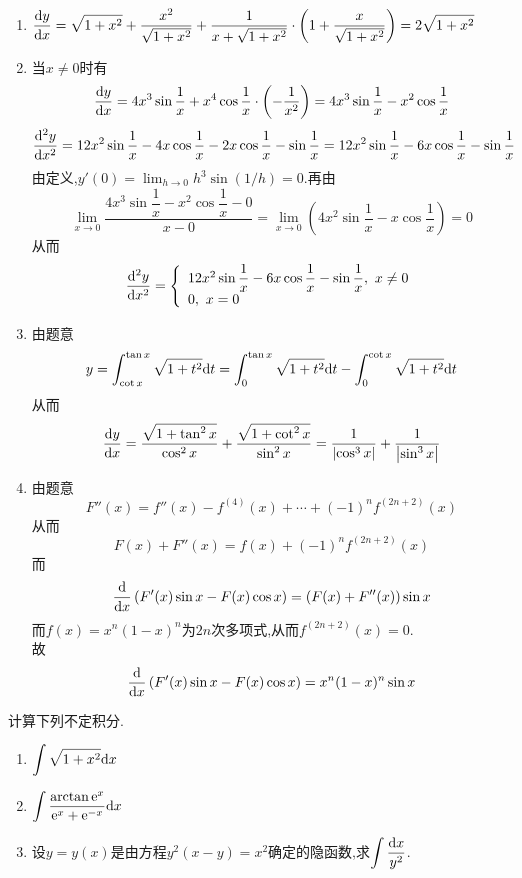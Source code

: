 \documentclass{ctexart}
\begin{document}
\begin{solution}
    \begin{enumerate}[leftmargin=*,label=\textbf{(\arabic*)}]
        \item $\displaystyle\dfrac{\mathrm{d} y}{\mathrm{d} x}
            =\sqrt{1+x^2}+\dfrac{x^2}{\sqrt{1+x^2}}+\dfrac{1}{x+\sqrt{1+x^2}}\cdot\left(1+\dfrac{x}{\sqrt{1+x^2}}\right)
            =2\sqrt{1+x^2}$
        \item 当$x\neq0$时有
            $$\dfrac{\mathrm{d} y}{\mathrm{d} x}=4x^3\sin{\dfrac{1}{x}}+x^4\cos\dfrac{1}{x}\cdot\left(-\dfrac{1}{x^2}\right)=4x^3\sin{\dfrac{1}{x}}-x^2\cos{\dfrac{1}{x}}$$
            $$\dfrac{\mathrm{d}^2y}{\mathrm{d} x^2}=12x^2\sin\dfrac{1}{x}-4x\cos\dfrac{1}{x}-2x\cos\dfrac{1}{x}-\sin\dfrac{1}{x}=12x^2\sin\dfrac{1}{x}-6x\cos\dfrac{1}{x}-\sin\dfrac{1}{x}$$
            由定义,$y'(0)=\displaystyle\lim_{h\to0}h^3\sin(1/h)=0$.再由
            $$\lim_{x\to 0}{\dfrac{4x^3\sin{\dfrac{1}{x}}-x^2\cos{\dfrac{1}{x}}-0}{x-0}}=\lim_{x\to0}\left(4x^2\sin{\dfrac{1}{x}}-x\cos\dfrac{1}{x}\right)=0$$
            从而
            $$\dfrac{\di^2 y}{\dx^2}=\left\{
            \begin{array}{l}
                12x^2\sin\dfrac{1}{x}-6x\cos\dfrac{1}{x}-\sin\dfrac{1}{x},\ x\neq 0 \\
                0,\ x=0
            \end{array}
            \right.$$
        \item 由题意$$y=\int_{\cot x}^{\tan x}\sqrt{1+t^2}\mathrm{d} t=\int_{0}^{\tan x}\sqrt{1+t^2}\mathrm{d} t-\int_{0}^{\cot x}\sqrt{1+t^2}\mathrm{d} t$$
            从而$$\dfrac{\mathrm{d} y}{\mathrm{d} x}=\dfrac{\sqrt{1+\tan^2x}}{\cos^2x}+\dfrac{\sqrt{1+\cot^2x}}{\sin^2x}=\dfrac{1}{\left|\cos^3x\right|}+\dfrac{1}{\left|\sin^3x\right|}$$
        \item 由题意$$F''(x)=f''(x)-f^{(4)}(x)+\cdots+(-1)^nf^{(2n+2)}(x)$$
            从而$$F(x)+F''(x)=f(x)+(-1)^nf^{(2n+2)}(x)$$
            而$$\dfrac{\mathrm{d}}{\mathrm{d} x}\left(F'(x)\sin x-F(x)\cos x\right)=(F(x)+F''(x))\sin x$$
            而$f(x)=x^n(1-x)^n$为$2n$次多项式,从而$f^{(2n+2)}(x)=0$.\\
            故$$\dfrac{\mathrm{d}}{\mathrm{d} x}\left(F'(x)\sin x-F(x)\cos x\right)=x^n(1-x)^n\sin x$$
    \end{enumerate}
\end{solution}
\begin{problem}[3.(15\songti{分})]
    计算下列不定积分.
        \begin{enumerate}[label=\textbf{(\arabic*)}]
            \item $\displaystyle\int\sqrt{1+x^2}\mathrm{d} x$
            \item $\displaystyle\int\dfrac{\arctan \mathrm{e}^x}{\mathrm{e}^x+\mathrm{e}^{-x}}\mathrm{d} x$
            \item 设$y=y(x)$是由方程$y^2(x-y)=x^2$确定的隐函数,求$\displaystyle\int{\dfrac{\mathrm{d}x}{y^2}}$.
        \end{enumerate}
\end{problem}
\end{document}

